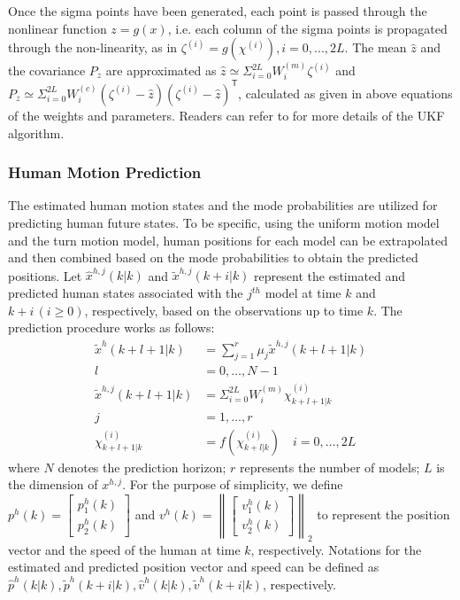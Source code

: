\documentclass[letterpaper, 10 pt, conference]{ieeeconf}
\newcommand{\todoQ}[1]{\vspace{0px} %
	\todo[inline, color=orange!50]{\textbf{[Note:]} {#1}} %
}
\begin{document}
	Once the sigma points have been generated, each point is passed through the nonlinear function $z=g(x)$, i.e. each column of the sigma points is propagated through the non-linearity, as in $\zeta^{(i)}=g(\chi^{(i)}), i=0,...,2L$. The mean $\hat{z}$ and the covariance $P_z$ are approximated as $\hat{z}\simeq \Sigma_{i=0}^{2L}W_i^{(m)} \zeta^{(i)}$ and $P_z \simeq  \Sigma_{i=0}^{2L}W_i^{(c)}(\zeta^{(i)}-\hat{z})(\zeta^{(i)}-\hat{z})^\mathsf{T}$, calculated as given in above equations of the weights and parameters\cite{hong2013vehicle}. Readers can refer to \cite {haykin2004kalman} for more details of the UKF algorithm. 
	
	\subsubsection{Human Motion Prediction}\label{subsec:motion_pred}
	The estimated human motion states and the mode probabilities are utilized for predicting human future states.
	To be specific, using the uniform motion model and the turn motion model, human positions for each model can be extrapolated and then combined based on the mode probabilities to obtain the predicted positions.
	Let $\hat{x}^{h,j}(k|k)$ and $\tilde{x}^{h,j}(k+i|k)$ represent the estimated and predicted human states associated with the $j^{th}$ model at time $k$ and $k+i\,(i\ge 0)$, respectively, based on the observations up to time $k$.
	The prediction procedure works as follows:
	\begin{subequations}\label{eqn:motion_pred_imm}
		\begin{align}
			\tilde{x}^h(k+l+1|k)&=\sum\limits_{j=1}^{r}\mu_j \tilde{x}^{h,j}(k+l+1|k)\\ l&=0,\dots,N-1\nonumber \\
			\tilde{x}^{h,j}(k+l+1|k)&=\Sigma_{i=0}^{2L}W_i^{(m)} \chi_{k+l+1|k}^{(i)}\\ j&=1,\dots,r\nonumber \\
			\chi_{k+l+1|k}^{(i)}&=f(\chi_{k+l|k}^{(i)}) \quad i=0,\dots, 2L
		\end{align}
	\end{subequations}
	where $N$ denotes the prediction horizon; $r$ represents the number of models; $L$ is the dimension of $x^{h,j}$.
	For the purpose of simplicity, we define $p^h(k)=
	\left[ 
	\begin{array}{c}
	p^h_1(k)\\
	p^h_2(k)
	\end{array}\right] $ and $v^h(k)=
	\left\|\left[ 
	\begin{array}{c}
	v^h_1(k)\\
	v^h_2(k)
	\end{array}\right]\right\|_2
	$ to represent the position vector and the speed of the human at time $k$, respectively.
	Notations for the estimated and predicted position vector and speed can be defined as $\hat{p}^h(k|k),\tilde{p}^h(k+i|k),\hat{v}^h(k|k),\tilde{v}^h(k+i|k)$, respectively.
	
\end{document}

